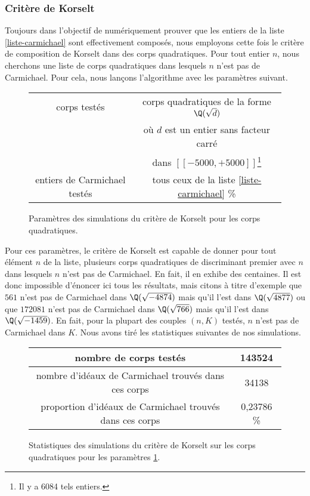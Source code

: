 \subsubsection{Critère de Korselt}

Toujours dans l'objectif de numériquement prouver que les entiers de la liste \ref{liste-carmichael} sont effectivement composés, nous employons cette fois le critère de composition de Korselt \label{test-primalite-korselt} dans des corps quadratiques. Pour tout entier $n$, nous cherchons une liste de corps quadratiques dans lesquels $n$ n'est pas de Carmichael. Pour cela, nous lançons l'algorithme avec les paramètres suivant.

\begin{figure}[h!]\label{param-korselt-quadra}
	\begin{center}
		\begin{tabular}{|c|c|}
			\hline
			corps testés & corps quadratiques de la forme $\Q(\sqrt{d})$ \\ & où $d$ est un entier sans facteur carré \\ & dans $[\![-5000, +5000]\!]$\footnote{Il y a 6084 tels entiers.} \\\hline
			entiers de Carmichael testés & tous ceux de la liste \ref{liste-carmichael} \% \\\hline
		\end{tabular}
		\caption{Paramètres des simulations du critère de Korselt pour les corps quadratiques.}
	\end{center}
\end{figure}

Pour ces paramètres, le critère de Korselt est capable de donner pour tout élément $n$ de la liste, plusieurs corps quadratiques de discriminant premier avec $n$ dans lesquels $n$ n'est pas de Carmichael. En fait, il en exhibe des centaines. Il est donc impossible d'énoncer ici tous les résultats, mais citons à titre d'exemple que $561$ n'est pas de Carmichael dans $\Q(\sqrt{-4874})$ mais qu'il l'est dans $\Q(\sqrt{4877})$ ou que $172081$ n'est pas de Carmichael dans $\Q(\sqrt{766})$ mais qu'il l'est dans $\Q(\sqrt{-1459})$. En fait, pour la plupart des couples $(n, K)$ testés, $n$ n'est pas de Carmichael dans $K$. Nous avons tiré les statistiques suivantes de nos simulations.

\begin{figure}[h!]
	\begin{center}
		\begin{tabular}{|c|c|}
			\hline
			nombre de corps testés & 143524 \\\hline
			nombre d'idéaux de Carmichael trouvés dans ces corps & 34138 \\\hline
			proportion d'idéaux de Carmichael trouvés dans ces corps & 0,23786 \% \\\hline
		\end{tabular}
		\caption{Statistiques des simulations du critère de Korselt sur les corps quadratiques pour les paramètres \ref{param-korselt-quadra}.}
	\end{center}
\end{figure}

